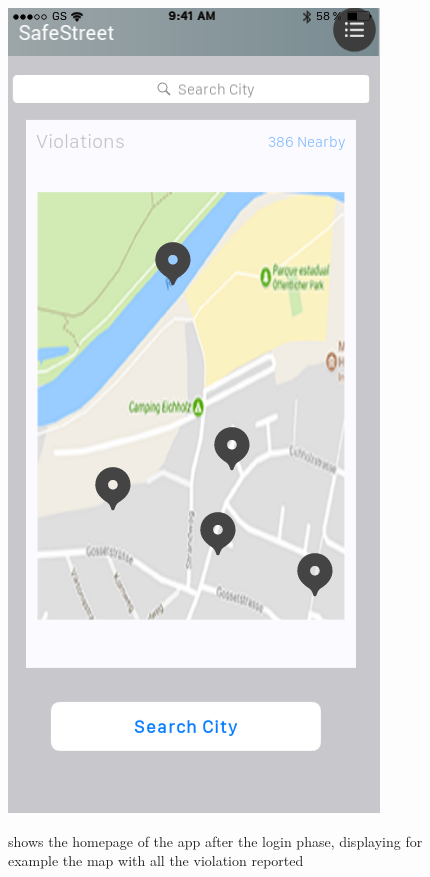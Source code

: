 \documentclass[../RASD.tex]{subfiles}
\begin{document}
    \begin{figure}[H]
        \centering
        \includegraphics[scale = 0.4]{assets/home.png}\\[1.6 cm]
        \caption[\textit{User} Home \textit{Mockup}]{shows the homepage of the app after the login phase, displaying for example the map with all the violation reported}
    \end{figure}
\end{document}
